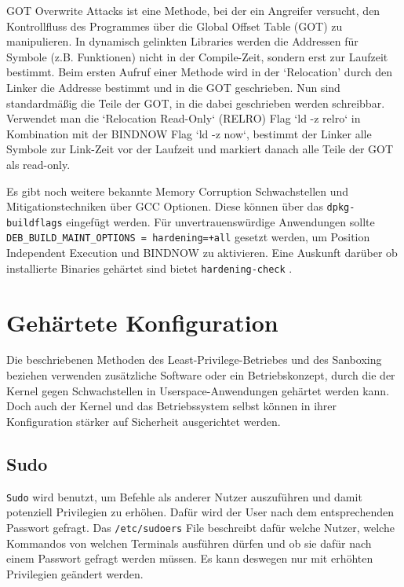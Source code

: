 
GOT Overwrite Attacks ist eine Methode, bei der ein Angreifer versucht, den Kontrollfluss des Programmes über die Global Offset Table (GOT) zu manipulieren. In dynamisch gelinkten Libraries werden die Addressen für Symbole (z.B. Funktionen) nicht in der Compile-Zeit, sondern erst zur Laufzeit bestimmt. Beim ersten Aufruf einer Methode wird in der `Relocation' durch den Linker die Addresse bestimmt und in die GOT geschrieben. Nun sind standardmäßig die Teile der GOT, in die dabei geschrieben werden schreibbar. 
Verwendet man die `Relocation Read-Only` (RELRO) Flag `ld -z relro` in Kombination mit der BINDNOW Flag `ld -z now`, bestimmt der Linker alle Symbole zur Link-Zeit vor der Laufzeit und markiert danach alle Teile der GOT als read-only. \cite{relro}

Es gibt noch weitere bekannte Memory Corruption Schwachstellen und Mitigationstechniken über GCC Optionen. Diese können über das \texttt{dpkg-buildflags} eingefügt werden. Für unvertrauenswürdige Anwendungen sollte \texttt{DEB\_BUILD\_MAINT\_OPTIONS = hardening=+all} gesetzt werden, um Position Independent Execution und BINDNOW zu aktivieren. Eine Auskunft darüber ob installierte Binaries gehärtet sind bietet \texttt{hardening-check} \cite{debian-hardening}. 


\section{Gehärtete Konfiguration}

Die beschriebenen Methoden des Least-Privilege-Betriebes und des Sanboxing beziehen verwenden zusätzliche Software oder ein Betriebskonzept, durch die der Kernel gegen Schwachstellen in Userspace-Anwendungen gehärtet werden kann. Doch auch der Kernel und das Betriebssystem selbst können in ihrer Konfiguration stärker auf Sicherheit ausgerichtet werden.

\subsection{Sudo}

\texttt{Sudo} wird benutzt, um Befehle als anderer Nutzer auszuführen und damit potenziell Privilegien zu erhöhen. Dafür wird der User nach dem entsprechenden Passwort gefragt. Das \texttt{/etc/sudoers} File beschreibt dafür welche Nutzer, welche Kommandos von welchen Terminals ausführen dürfen und ob sie dafür nach einem Passwort gefragt werden müssen. Es kann deswegen nur mit erhöhten Privilegien geändert werden. \cite{man-sudo}

